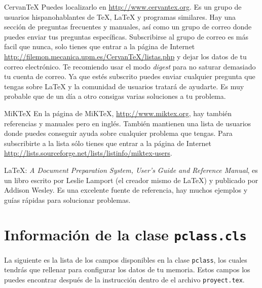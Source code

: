 \begin{description}
\item Cervan\TeX{}  Puedes localizarlo en \url{http://www.cervantex.org}. Es un grupo
de usuarios hispanohablantes de \TeX{}, \LaTeX{} y programas similares. Hay una secci\'on de
preguntas frecuentes y manuales, as\'i como un grupo de correo donde puedes enviar
tus preguntas espec\'ificas. Subscribirse al grupo de correo es m\'as facil que nunca, solo
tienes que entrar a la p\'agina de Internet
\url{http://filemon.mecanica.upm.es/CervanTeX/listas.php} y dejar los datos de tu correo
electr\'onico. Te recomiendo usar el modo \emph{digest} para no saturar demasiado tu cuenta
de correo. Ya que est\'es subscrito puedes enviar cualquier pregunta que tengas sobre
\LaTeX{} y la comunidad de usuarios tratar\'a de ayudarte. Es muy probable
que de un d\'ia a otro consigas varias soluciones a tu problema.

\item MiK\TeX{}  En la p\'agina de MiK\TeX{}, \url{http://www.miktex.org}, hay
tambi\'en referencias y manuales pero en ingl\'es. Tambi\'en mantienen una lista de usuarios
donde puedes conseguir ayuda sobre cualquier problema que tengas. Para subscribirte a la
lista s\'olo tienes que entrar a la p\'agina de Internet  \url{http://lists.sourceforge.net/lists/listinfo/miktex-users}.

\item \LaTeX: \emph{A Document Preparation System, User's Guide and Reference Manual}, es
un libro escrito por Leslie Lamport (el creador mismo de \LaTeX{}) y publicado por Addison Wesley. Es una excelente fuente de referencia, hay muchos ejemplos y gu\'ias r\'apidas para solucionar problemas. 
\end{description}



\section{Informaci\'on de la clase \texttt{pclass.cls}}\label{pclass}

La  siguiente es la lista de los campos disponibles en la clase
\texttt{pclass}, los cuales tendr\'as que rellenar para configurar los datos de tu memoria. Estos
campos los puedes encontrar despu\'es de la instrucci\'on \verb|| dentro de el
archivo \texttt{proyect.tex}.

